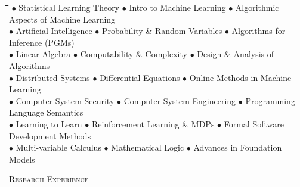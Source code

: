 \documentclass{article}
\newenvironment{changemargin}[2]{%
  \begin{list}{}{%
    \setlength{\topsep}{0pt}%
    \setlength{\leftmargin}{#1}%
    \setlength{\rightmargin}{#2}%
    \setlength{\listparindent}{\parindent}%
    \setlength{\itemindent}{\parindent}%
    \setlength{\parsep}{\parskip}%
  }%
  \item[]}{\end{list}
}
\newcommand{\lineover}{
	\begin{changemargin}{-0.05in}{-0.05in}
		\vspace*{-8pt}
		\hrulefill \\
		\vspace*{-2pt}
	\end{changemargin}
}
\newcommand{\header}[1]{
	\begin{changemargin}{-0.5in}{-0.5in}
		\scshape{#1}\\
  	\lineover
	\end{changemargin}
}
\newenvironment{body} {
	\vspace*{-16pt}
	\begin{changemargin}{-0.25in}{-0.5in}
  }	
	{\end{changemargin}
}
\newcommand{\bul}{$\bullet$ \hspace*{0em}}
\begin{document}
\begin{body}
	\vspace{14pt}
	\begin{tabbing}
	\hspace*{1cm}\=\hspace*{1cm}\=\hspace*{1cm}\=\hspace*{1cm}\=\hspace*{1cm}\=\hspace*{1cm}\=\hspace*{1cm}\=\hspace*{1cm}\=\hspace*{1cm}\=\hspace*{1cm}\=\hspace*{1cm}\=\hspace*{1cm}\=\hspace*{1cm} \kill
	\bul Statistical Learning Theory \> \> \> \> \> \bul Intro to Machine Learning \> \> \> \> \> \> \bul Algorithmic Aspects of Machine Learning  \\
	\bul Artificial Intelligence \> \> \> \> \> \bul Probability \& Random Variables \> \> \> \> \> \> \bul Algorithms for Inference (PGMs) \\
	\bul Linear Algebra \> \> \> \> \> \bul Computability \& Complexity \> \> \> \> \> \> \bul Design \& Analysis of Algorithms \\
	\bul Distributed Systems \> \> \> \> \> \bul Differential Equations \> \> \> \> \> \> \bul Online Methods in Machine Learning \\
    \bul Computer System Security \> \> \> \> \> \bul Computer System Engineering \> \> \> \> \> \> \bul Programming Language Semantics  \\
    \bul Learning to Learn \> \> \> \> \> \bul Reinforcement Learning \& MDPs \> \> \> \> \> \>  \bul Formal Software Development Methods \\
    \bul Multi-variable Calculus \> \> \> \> \> \bul Mathematical Logic \> \> \> \> \> \>  \bul Advances in Foundation Models \\
	\end{tabbing}
	\end{body}
\smallskip

\header{Research Experience}
\end{document}
